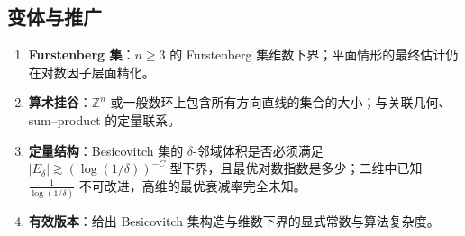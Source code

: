 \subsection{变体与推广}

\begin{enumerate}[label=(\arabic*)]
    \item \textbf{Furstenberg 集}：$n \ge 3$ 的 Furstenberg 集维数下界；平面情形的最终估计仍在对数因子层面精化。
    \item \textbf{算术挂谷}：$\mathbb{Z}^n$ 或一般数环上包含所有方向直线的集合的大小；与关联几何、sum--product 的定量联系。
    \item \textbf{定量结构}：Besicovitch 集的 $\delta$-邻域体积是否必须满足 $|E_\delta| \gtrsim (\log (1/\delta))^{-C}$ 型下界，且最优对数指数是多少；二维中已知 $\frac{1}{\log(1/\delta)}$ 不可改进，高维的最优衰减率完全未知。
    \item \textbf{有效版本}：给出 Besicovitch 集构造与维数下界的显式常数与算法复杂度。
\end{enumerate}
